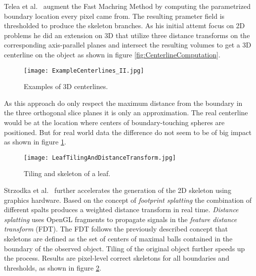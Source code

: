 Telea et al.~\cite{alexandru2002augmented} augment the Fast Machring Method by computing the parametrized boundary location every pixel came from. The resulting prameter field is thresholded to produce the skeleton branches.
As his initial attemt focus on 2D problems he did an extension on 3D that utilize three distance transforms on the corresponding axis-parallel planes and intersect the resulting volumes to get a 3D centerline on the object as shown in figure \ref{fig:CenterlineComputation}.

\begin{figure}[h]
	\centering
	\texttt{[image: ExampleCenterlines\_II.jpg]} \\
	\caption{Examples of 3D centerlines.}
	\cite{alexandru2002augmented}
	\label{fig:ExampleCenterlines_II}
\end{figure} 

As this approach do only respect the maximum distance from the boundary in the three orthogonal slice planes it is only an approximation. The real centerline would be at the location where centers of boundary-touching spheres are positioned. But for real world data the difference do not seem to be of big impact as shown in figure \ref{fig:ExampleCenterlines_II}. 

\begin{figure}[h]
	\centering
	\texttt{[image: LeafTilingAndDistanceTransform.jpg]} \\
	\caption{Tiling and skeleton of a leaf.}
	\cite{strzodka2004generalized}
	\label{fig:LeafTilingAndDistanceTransform}
\end{figure} 

Strzodka et al.~\cite{strzodka2004generalized} further accelerates the generation of the 2D skeleton using graphics hardware. Based on the concept of \emph{footprint splatting} the combination of different spalts produces a weighted distance transform in real time. \emph{Distance splatting} uses OpenGL fragments to propagate signals in the \emph{feature distance transform} (FDT). The FDT follows the previously described concept that skeletons are defined as the set of centers of maximal balls contained in the boundary of the observed object. Tiling of the original object further speeds up the process. Results are pixel-level correct skeletons for all boundaries and thresholds, as shown in figure \ref{fig:LeafTilingAndDistanceTransform}.


